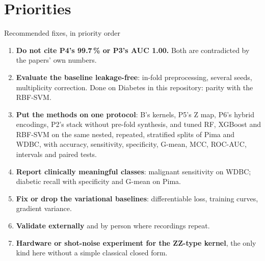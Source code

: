 \documentclass[aspectratio=169,10pt,t,xcolor={table}]{beamer}
\begin{document}
\section{Priorities}
\begin{frame}{Recommended fixes, in priority order}
\footnotesize
\begin{enumerate}
  \item \textbf{Do not cite P4's 99.7\,\% or P3's AUC 1.00.} Both are contradicted by the papers' own numbers.
  \item \textbf{Evaluate the baseline leakage-free}: in-fold preprocessing, several seeds, multiplicity correction. Done on Diabetes in this repository: parity with the RBF-SVM.
  \item \textbf{Put the methods on one protocol}: B's kernels, P5's Z map, P6's hybrid encodings, P2's stack without pre-fold synthesis, and tuned RF, XGBoost and RBF-SVM on the same nested, repeated, stratified splits of Pima and WDBC, with accuracy, sensitivity, specificity, G-mean, MCC, ROC-AUC, intervals and paired tests.
  \item \textbf{Report clinically meaningful classes}: malignant sensitivity on WDBC; diabetic recall with specificity and G-mean on Pima.
  \item \textbf{Fix or drop the variational baselines}: differentiable loss, training curves, gradient variance.
  \item \textbf{Validate externally} and by person where recordings repeat.
  \item \textbf{Hardware or shot-noise experiment for the ZZ-type kernel}, the only kind here without a simple classical closed form.
\end{enumerate}
\end{frame}
\end{document}
